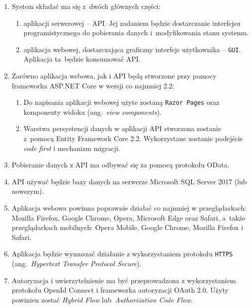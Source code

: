 \begin{enumerate}[labelwidth=1em,label=\arabic*.]

\item System składać ma się z~dwóch głównych części:
\begin{enumerate}[label=\alph*)]
\item aplikacji serwerowej -- API. Jej zadaniem będzie dostarczanie interfejsu programistycznego do pobierania danych i~modyfikowania stanu systemu.
\item aplikacja webowej, dostarczająca graficzny interfejs użytkownika -- \texttt{GUI}. Aplikacja ta~będzie konsumować API.
\end{enumerate}

\item Zarówno aplikacja webowa, jak i API będą stworzone przy pomocy frameworka ASP.NET Core w wersji co najmniej 2.2: 
\begin{enumerate}[label=\alph*)]
\item Do napisania aplikacji webowej użyte zostaną \texttt{Razor Pages} oraz komponenty widoku (ang.~\emph{view components}). 
\item Warstwa persystencji danych w aplikacji API stworzona zostanie z~pomocą Entity Framework Core 2.2. Wykorzystane zostanie podejście \emph{code first} i mechanizm migracji.
\end{enumerate}

\item Pobieranie danych z API ma odbywać się za pomocą protokołu OData.

\item API używać będzie bazy danych na serwerze Microsoft SQL Server 2017 (lub nowszym).

\item Aplikacja webowa powinna poprawnie działać co najmniej w przeglądarkach: Mozilla Firefox, Google Chrome, Opera, Microsoft Edge oraz Safari, a~także przeglądarkach mobilnych: Opera Mobile, Google Chrome, Mozilla Firefox i Safari.

\item Aplikacja będzie wymuszać działanie z wykorzystaniem protokołu \texttt{HTTPS} (ang.~\emph{Hypertext Transfer Protocol Secure}).

\item Autoryzacja i uwierzytelnienie ma być przeprowadzona z wykorzystaniem protokołu OpenId Connect i frameworka autoryzacji OAuth 2.0. Użyty powinien zostać \emph{Hybrid Flow} lub~\emph{Authorization Code Flow}.


\end{enumerate}
